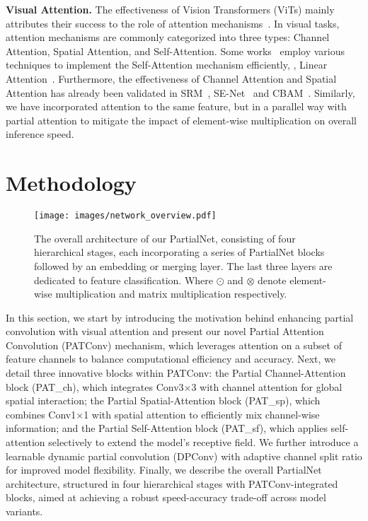 {\bf Visual Attention.}
The effectiveness of Vision Transformers (ViTs) mainly attributes their success to the role of attention mechanisms~\cite{raghu2021vision, paul2022vision}. In visual tasks, attention mechanisms are commonly categorized into three types: Channel Attention, Spatial Attention, and Self-Attention. Some works~\cite{Mehta2022, Rao2022, Shaker2023, Cai2023b} employ various techniques to implement the Self-Attention mechanism efficiently, \eg, Linear Attention~\cite{Wang2020c, Cai2023b}. Furthermore, the effectiveness of Channel Attention and Spatial Attention has already been validated in SRM~\cite{Lee2019a}, SE-Net~\cite{Hu2018} and CBAM~\cite{Woo2018}. Similarly, we have incorporated attention to the same feature, but in a parallel way with partial attention to mitigate the impact of element-wise multiplication on overall inference speed.

\section{Methodology}
\label{sec:method}
\begin{figure*}[ht]
  \centering
  \texttt{[image: images/network\_overview.pdf]}
  \caption{The overall architecture of our PartialNet, consisting of four hierarchical stages, each incorporating a series of PartialNet blocks followed by an embedding or merging layer. The last three layers are dedicated to feature classification. Where $\odot$ and $\otimes$ denote element-wise multiplication and matrix multiplication respectively.}
  \label{fig:network_overview}
\end{figure*}

In this section, we start by introducing the motivation behind enhancing partial convolution with visual attention and present our novel Partial Attention Convolution (PATConv) mechanism, which leverages attention on a subset of feature channels to balance computational efficiency and accuracy. Next, we detail three innovative blocks within PATConv: the Partial Channel-Attention block (PAT\_ch), which integrates Conv3$\times$3 with channel attention for global spatial interaction; the Partial Spatial-Attention block (PAT\_sp), which combines Conv1$\times$1 with spatial attention to efficiently mix channel-wise information; and the Partial Self-Attention block (PAT\_sf), which applies self-attention selectively to extend the model's receptive field. We further introduce a learnable dynamic partial convolution (DPConv) with adaptive channel split ratio for improved model flexibility. Finally, we describe the overall PartialNet architecture, structured in four hierarchical stages with PATConv-integrated blocks, aimed at achieving a robust speed-accuracy trade-off across model variants.

